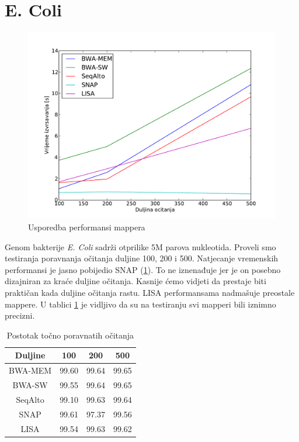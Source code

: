 \documentclass[times, utf8, diplomski]{fer}
\begin{document}
\section {E. Coli}

\begin{figure}[H]
\centering
\includegraphics[width=1.0\textwidth]{../img/ecoli-time.pdf}
\caption{Usporedba performansi mappera}
\label{ecoli-time}
\end{figure}

Genom bakterije \emph{E. Coli} sadrži otprilike 5M parova nukleotida. Proveli smo testiranja poravnanja očitanja duljine 100, 200 i 500. Natjecanje vremenskih performansi je jasno pobijedio SNAP (\ref{ecoli-time}). To ne iznenađuje jer je on posebno dizajniran za kraće duljine očitanja. Kasnije ćemo vidjeti da prestaje biti praktičan kada duljine očitanja rastu. LISA performansama nadmašuje preostale mappere. U tablici \ref{ecoli-correct} je vidljivo da su na testiranju svi mapperi bili iznimno precizni.

\begin{table}[H]
\centering
\begin{tabular}{|c||c|c|c|}
\hline
	Duljine & 100 & 200 & 500\\
\hline
\hline
	BWA-MEM & 99.60 & 99.64 & 99.65\\
\hline
	BWA-SW  & 99.55 & 99.64 & 99.65\\
\hline
	SeqAlto & 99.10 & 99.63 & 99.64\\
\hline
	SNAP    & 99.61 & 97.37 & 99.56\\
\hline
	LISA    & 99.54 & 99.63 & 99.62\\
\hline
\end{tabular}
\caption{Postotak točno poravnatih očitanja}\label{ecoli-correct}
\end{table}
\end{document}
